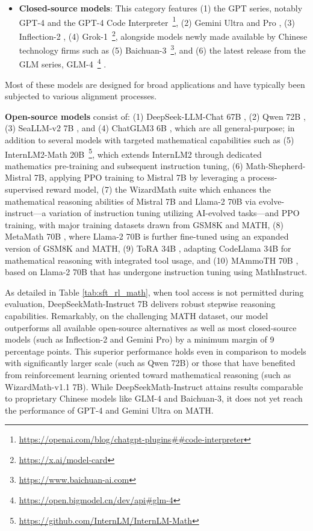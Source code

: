 \begin{itemize}[topsep=0pt]
    \item \textbf{Closed-source models}: This category features (1) the GPT series, notably GPT-4 \citep{gpt4} and the GPT-4 Code Interpreter~\footnote{\url{https://openai.com/blog/chatgpt-plugins\#\#code-interpreter}}, (2) Gemini Ultra and Pro \citep{gemini}, (3) Inflection-2 \citep{inflection-2}, (4) Grok-1~\footnote{\url{https://x.ai/model-card}}, alongside models newly made available by Chinese technology firms such as (5) Baichuan-3~\footnote{\url{https://www.baichuan-ai.com}}, and (6) the latest release from the GLM series, GLM-4~\footnote{\url{https://open.bigmodel.cn/dev/api\#glm-4}} \citep{glm}.
\end{itemize}

Most of these models are designed for broad applications and have typically been subjected to various alignment processes.

\item \textbf{Open-source models} consist of: (1) DeepSeek-LLM-Chat 67B \citep{deepseek-llm}, (2) Qwen 72B \citep{qwen}, (3) SeaLLM-v2 7B \citep{seallm}, and (4) ChatGLM3 6B \citep{chatglm3}, which are all general-purpose; in addition to several models with targeted mathematical capabilities such as (5) InternLM2-Math 20B~\footnote{\url{https://github.com/InternLM/InternLM-Math}}, which extends InternLM2 through dedicated mathematics pre-training and subsequent instruction tuning, (6) Math-Shepherd-Mistral 7B, applying PPO training \citep{schulman2017proximal} to Mistral 7B \citep{mistral} by leveraging a process-supervised reward model, (7) the WizardMath suite \citep{wizardmath} which enhances the mathematical reasoning abilities of Mistral 7B and Llama-2 70B \citep{llama2} via evolve-instruct—a variation of instruction tuning utilizing AI-evolved tasks—and PPO training, with major training datasets drawn from GSM8K and MATH, (8) MetaMath 70B \citep{metamath}, where Llama-2 70B is further fine-tuned using an expanded version of GSM8K and MATH, (9) ToRA 34B \cite{tora}, adapting CodeLlama 34B for mathematical reasoning with integrated tool usage, and (10) MAmmoTH 70B \citep{MathInstruct}, based on Llama-2 70B that has undergone instruction tuning using MathInstruct.

As detailed in Table \ref{tab:sft_rl_math}, when tool access is not permitted during evaluation, DeepSeekMath-Instruct 7B delivers robust stepwise reasoning capabilities. Remarkably, on the challenging MATH dataset, our model outperforms all available open-source alternatives as well as most closed-source models (such as Inflection-2 and Gemini Pro) by a minimum margin of 9 percentage points. This superior performance holds even in comparison to models with significantly larger scale (such as Qwen 72B) or those that have benefited from reinforcement learning oriented toward mathematical reasoning (such as WizardMath-v1.1 7B). While DeepSeekMath-Instruct attains results comparable to proprietary Chinese models like GLM-4 and Baichuan-3, it does not yet reach the performance of GPT-4 and Gemini Ultra on MATH.

